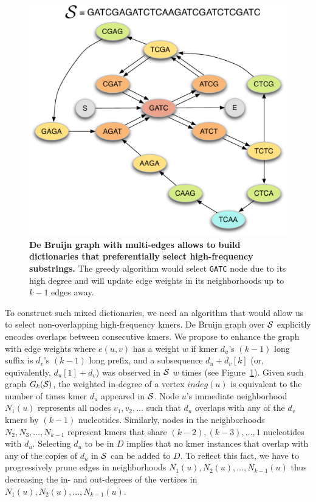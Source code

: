 \documentclass[12pt]{cmuthesis}
\begin{document}
  \begin{figure}[ht]
    \centering
    \includegraphics[width=0.7\linewidth]{figures/huffmer_node_neighborhoods}
    \caption{\textbf{De Bruijn graph with multi-edges allows to build dictionaries that preferentially select high-frequency substrings.} The greedy algorithm would select \texttt{GATC} node due to its high degree and will update edge weights in its neighborhoods up to $k-1$ edges away.}
    \label{fig:denovo:debruijn}
  \end{figure}

  To construct such mixed dictionaries, we need an algorithm that would allow us to select non-overlapping high-frequency kmers. De Bruijn graph over $\mathcal{S}$ explicitly encodes overlaps between consecutive kmers. We propose to enhance the graph with edge weights where $e(u,v)$ has a weight $w$ if kmer $d_u$'s $(k-1)$ long suffix is $d_v$'s $(k-1)$ long prefix, and a subsequence $d_u + d_v[k]$ (or, equivalently, $d_u[1] + d_v$) was observed in $\mathcal{S}$ $w$ times (see Figure~\ref{fig:denovo:debruijn}). Given such graph $G_k(\mathcal{S})$, the weighted in-degree of a vertex $indeg(u)$ is equivalent to the number of times kmer $d_u$ appeared in $\mathcal{S}$. Node $u$'s immediate neighborhood $N_1(u)$ represents all nodes $v_1, v_2, \ldots$ such that $d_u$ overlaps with any of the $d_v$ kmers by $(k-1)$ nucleotides. Similarly, nodes in the neighborhoods $N_2, N_3, \ldots, N_{k-1}$ represent kmers that share $(k-2), (k-3), \ldots, 1$ nucleotides with $d_u$. Selecting $d_u$ to be in $D$ implies that no kmer instances that overlap with any of the copies of $d_u$ in $\mathcal{S}$ can be added to $D$. To reflect this fact, we have to progressively prune edges in neighborhoods $N_1(u), N_2(u), \ldots, N_{k-1}(u)$ thus decreasing the in- and out-degrees of the vertices in $N_1(u), N_2(u), \ldots, N_{k-1}(u)$. 
\end{document}
